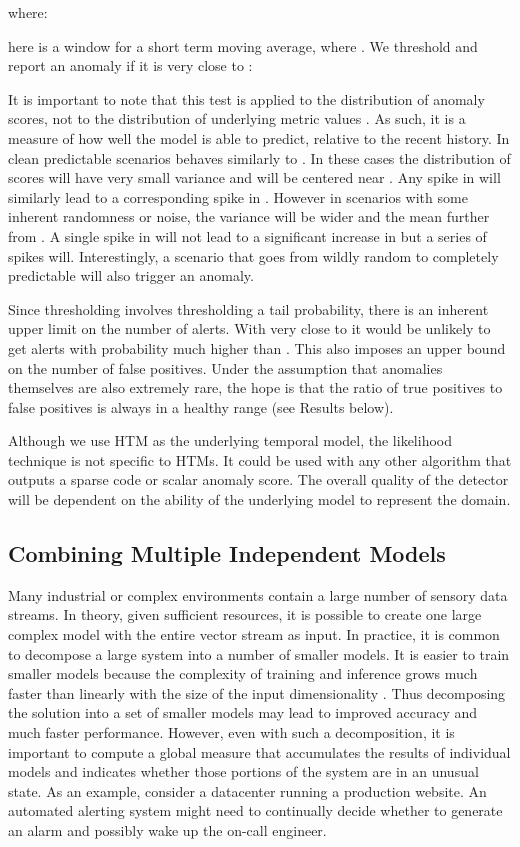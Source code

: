 \documentclass{article}
\begin{document}
where:



 here is a window for a short term moving average, where .
We threshold  and report an anomaly if it is very close to :



It is important to note that this test is applied to the distribution of anomaly
scores, not to the distribution of underlying metric values
. As such, it is a measure of how well the model is able to
predict, relative to the recent history. In clean predictable scenarios  behaves
similarly to . In these cases the distribution of scores will have very
small variance and will be centered near . Any spike in  will similarly
lead to a corresponding spike in . However in scenarios with some inherent
randomness or noise, the variance will be wider and the mean further from . A single
spike in  will not lead to a significant increase in  but a series of
spikes will.  Interestingly, a scenario that goes from wildly random to
completely predictable will also trigger an anomaly.

Since thresholding  involves thresholding a tail probability,
there is an inherent upper limit on the number of alerts. With 
very close to  it would be unlikely to get
alerts with probability much higher than . This also imposes an upper
bound on the number of false positives. Under the assumption that anomalies
themselves are also extremely rare, the hope is that the ratio of true positives
to false positives is always in a healthy range (see Results below).

Although we use HTM as the underlying temporal model, the likelihood technique is
not specific to HTMs. It could be used with any other algorithm that outputs a
sparse code or scalar anomaly score. The overall quality of the detector
will be dependent on the ability of the underlying model to represent the
domain.

\subsection{Combining Multiple Independent Models}

Many industrial or complex environments contain a large number of sensory data
streams. In theory, given sufficient resources, it is possible to create one
large complex model with the entire vector stream as input. In practice, it is
common to decompose a large system into a number of smaller models. It is easier
to train smaller models because the complexity of training and inference grows
much faster than linearly with the size of the input dimensionality
\cite{Bishop2006}. Thus decomposing the solution into a set of smaller models
may lead to improved accuracy and much faster performance. However, even with
such a decomposition, it is important to compute a global measure that
accumulates the results of individual models and indicates whether those
portions of the system are in an unusual state. As an example, consider a
datacenter running a production website. An automated alerting system might need
to continually decide whether to generate an alarm and possibly wake up the
on-call engineer.
\end{document}
